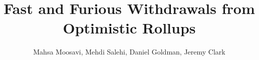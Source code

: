 \documentclass[runningheads]{llncs}
\begin{document}
\title{\Large \bf Fast and Furious Withdrawals from Optimistic Rollups}

\author{
	Mahsa Moosavi\inst{\dag\ddag},
	Mehdi Salehi\inst{\ddag},
	Daniel Goldman\inst{\ddag},
	Jeremy Clark\inst{\dag}
	}


\maketitle














\clearpage
\appendix
\end{document}
